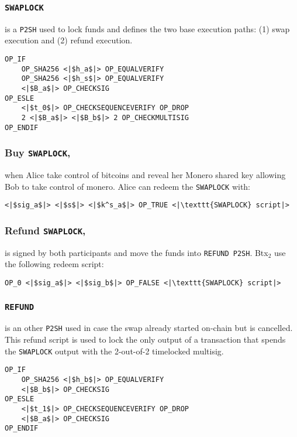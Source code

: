\documentclass{llncs}
\begin{document}
\subsubsection{\texttt{SWAPLOCK}}
is a \texttt{P2SH} used to lock funds and defines the two base execution paths: (1) swap execution and (2) refund execution.

\begin{verbatim}
OP_IF
    OP_SHA256 <|$h_a$|> OP_EQUALVERIFY
    OP_SHA256 <|$h_s$|> OP_EQUALVERIFY
    <|$B_a$|> OP_CHECKSIG
OP_ESLE
    <|$t_0$|> OP_CHECKSEQUENCEVERIFY OP_DROP
    2 <|$B_a$|> <|$B_b$|> 2 OP_CHECKMULTISIG
OP_ENDIF
\end{verbatim}

\subsubsection{Buy \texttt{SWAPLOCK},}
when Alice take control of bitcoins and reveal her Monero shared key allowing Bob to take control of monero. Alice can redeem the \texttt{SWAPLOCK} with:

\begin{verbatim}
<|$sig_a$|> <|$s$|> <|$k^s_a$|> OP_TRUE <|\texttt{SWAPLOCK} script|>
\end{verbatim}

\subsubsection{Refund \texttt{SWAPLOCK},}
is signed by both participants and move the funds into \texttt{REFUND P2SH}. Btx$_2$ use the following redeem script:

\begin{verbatim}
OP_0 <|$sig_a$|> <|$sig_b$|> OP_FALSE <|\texttt{SWAPLOCK} script|>
\end{verbatim}

\subsubsection{\texttt{REFUND}}
is an other \texttt{P2SH} used in case the swap already started on-chain but is cancelled. This refund script is used to lock the only output of a transaction that spends the \texttt{SWAPLOCK} output with the 2-out-of-2 timelocked multisig.

\begin{verbatim}
OP_IF
    OP_SHA256 <|$h_b$|> OP_EQUALVERIFY
    <|$B_b$|> OP_CHECKSIG
OP_ESLE
    <|$t_1$|> OP_CHECKSEQUENCEVERIFY OP_DROP
    <|$B_a$|> OP_CHECKSIG
OP_ENDIF
\end{verbatim}
\end{document}
